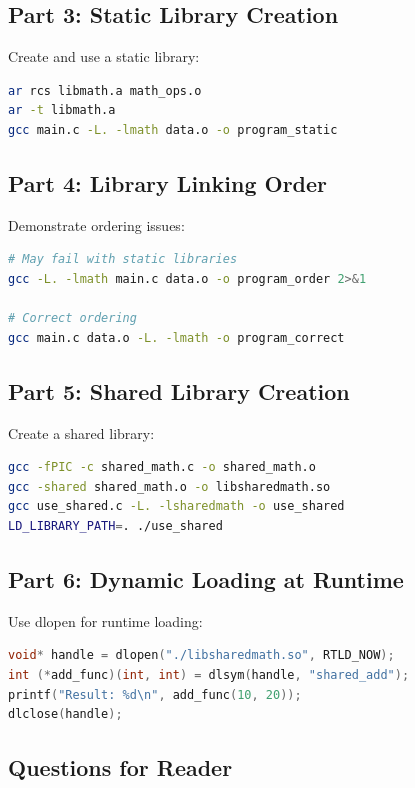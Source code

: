 \subsection{Part 3: Static Library Creation}

Create and use a static library:

\begin{lstlisting}[language=bash]
ar rcs libmath.a math_ops.o
ar -t libmath.a
gcc main.c -L. -lmath data.o -o program_static
\end{lstlisting}

\subsection{Part 4: Library Linking Order}

Demonstrate ordering issues:

\begin{lstlisting}[language=bash]
# May fail with static libraries
gcc -L. -lmath main.c data.o -o program_order 2>&1

# Correct ordering
gcc main.c data.o -L. -lmath -o program_correct
\end{lstlisting}

\subsection{Part 5: Shared Library Creation}

Create a shared library:

\begin{lstlisting}[language=bash]
gcc -fPIC -c shared_math.c -o shared_math.o
gcc -shared shared_math.o -o libsharedmath.so
gcc use_shared.c -L. -lsharedmath -o use_shared
LD_LIBRARY_PATH=. ./use_shared
\end{lstlisting}

\subsection{Part 6: Dynamic Loading at Runtime}

Use dlopen for runtime loading:

\begin{lstlisting}[language=C]
void* handle = dlopen("./libsharedmath.so", RTLD_NOW);
int (*add_func)(int, int) = dlsym(handle, "shared_add");
printf("Result: %d\n", add_func(10, 20));
dlclose(handle);
\end{lstlisting}

\subsection{Questions for Reader}

